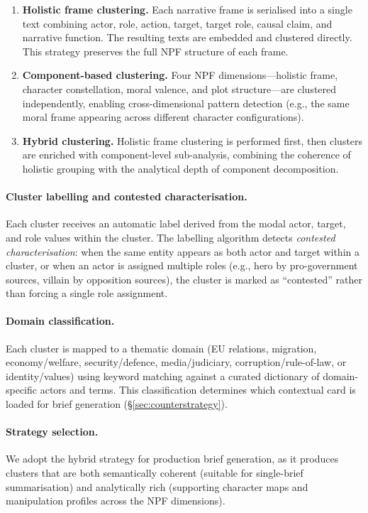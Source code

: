 \documentclass[10pt, a4paper]{article}
\begin{document}
\begin{enumerate}
\item \textbf{Holistic frame clustering.} Each narrative frame is serialised into a single text combining actor, role, action, target, target role, causal claim, and narrative function. The resulting texts are embedded and clustered directly. This strategy preserves the full NPF structure of each frame.

\item \textbf{Component-based clustering.} Four NPF dimensions---holistic frame, character constellation, moral valence, and plot structure---are clustered independently, enabling cross-dimensional pattern detection (e.g., the same moral frame appearing across different character configurations).

\item \textbf{Hybrid clustering.} Holistic frame clustering is performed first, then clusters are enriched with component-level sub-analysis, combining the coherence of holistic grouping with the analytical depth of component decomposition.
\end{enumerate}

\paragraph{Cluster labelling and contested characterisation.}
Each cluster receives an automatic label derived from the modal actor, target, and role values within the cluster. The labelling algorithm detects \emph{contested characterisation}: when the same entity appears as both actor and target within a cluster, or when an actor is assigned multiple roles (e.g., hero by pro-government sources, villain by opposition sources), the cluster is marked as ``contested'' rather than forcing a single role assignment.

\paragraph{Domain classification.}
Each cluster is mapped to a thematic domain (EU relations, migration, economy/welfare, security/defence, media/judiciary, corruption/rule-of-law, or identity/values) using keyword matching against a curated dictionary of domain-specific actors and terms. This classification determines which contextual card is loaded for brief generation (\S\ref{sec:counterstrategy}).

\paragraph{Strategy selection.}
We adopt the hybrid strategy for production brief generation, as it produces clusters that are both semantically coherent (suitable for single-brief summarisation) and analytically rich (supporting character maps and manipulation profiles across the NPF dimensions).
\end{document}
